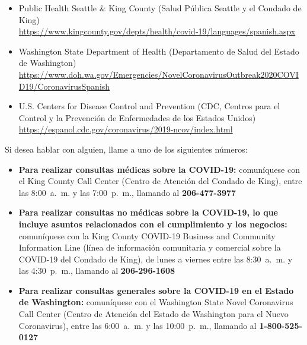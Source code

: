 \documentclass[10pt]{article}
\begin{document}
\begin{itemize}
\item
  Public Health \textemdash Seattle \& King County (Salud Pública \textemdash Seattle y el Condado de King)\\
  \url{https://www.kingcounty.gov/depts/health/covid-19/languages/spanish.aspx}

\item

  Washington State Department of Health (Departamento de Salud del Estado de Washington)\\
  \url{https://www.doh.wa.gov/Emergencies/NovelCoronavirusOutbreak2020COVID19/CoronavirusSpanish}

\item
  U.S. Centers for Disease Control and Prevention (CDC, Centros para el Control
  y la Prevención de Enfermedades de los Estados Unidos)\\
  \url{https://espanol.cdc.gov/coronavirus/2019-ncov/index.html}

\end{itemize}

Si desea hablar con alguien, llame a uno de los siguientes números:

\begin{itemize}

\item

  \textbf{Para realizar consultas médicas sobre la COVID-19:} comuníquese con el
  King County Call Center (Centro de Atención del Condado de King), entre las
  8:00 a. m. y las 7:00 p. m., llamando al \textbf{206-477-3977}

\item

  \textbf{Para realizar consultas no médicas sobre la COVID-19, lo que incluye
  asuntos relacionados con el cumplimiento y los negocios:} comuníquese con la
  King County COVID-19 Business and Community Information Line (línea de
  información comunitaria y comercial sobre la COVID-19 del Condado de King), de
  lunes a viernes entre las 8:30 a. m. y las 4:30 p. m., llamando al
  \textbf{206-296-1608}

\item

  \textbf{Para realizar consultas generales sobre la COVID-19 en el Estado de
  Washington:} comuníquese con el Washington State Novel Coronavirus Call Center
  (Centro de Atención del Estado de Washington para el Nuevo Coronavirus), entre
  las 6:00 a. m. y las 10:00 p. m., llamando al \textbf{1-800-525-0127}

\end{itemize}
\end{document}
